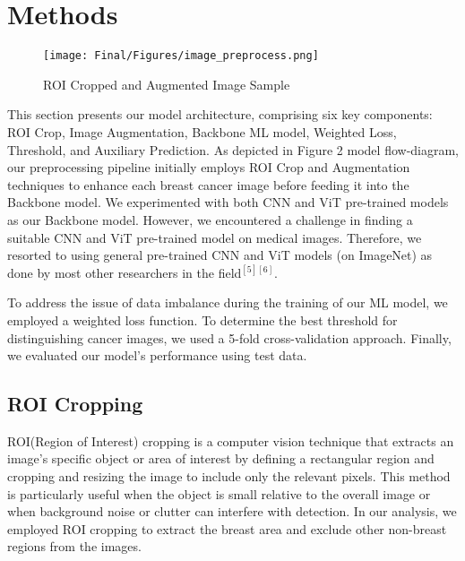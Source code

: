 \section{Methods}
\begin{figure*}[t]
    \centering
    \texttt{[image: Final/Figures/image\_preprocess.png]}
    \caption{ROI Cropped and Augmented Image Sample}
\end{figure*}

This section presents our model architecture, comprising six key components: ROI Crop, Image Augmentation, Backbone ML model, Weighted Loss, Threshold, and Auxiliary Prediction. As depicted in Figure 2 model flow-diagram, our preprocessing pipeline initially employs ROI Crop and Augmentation techniques to enhance each breast cancer image before feeding it into the Backbone model. We experimented with both CNN and ViT pre-trained models as our Backbone model. However, we encountered a challenge in finding a suitable CNN and ViT pre-trained model on medical images. Therefore, we resorted to using general pre-trained CNN and ViT models (on ImageNet) as done by most other researchers in the field${}^{[5][6]}$. 

To address the issue of data imbalance during the training of our ML model, we employed a weighted loss function. To determine the best threshold for distinguishing cancer images, we used a 5-fold cross-validation approach. Finally, we evaluated our model's performance using test data.

\subsection{ROI Cropping}
ROI(Region of Interest) cropping is a computer vision technique that extracts an image's specific object or area of interest by defining a rectangular region and cropping and resizing the image to include only the relevant pixels. This method is particularly useful when the object is small relative to the overall image or when background noise or clutter can interfere with detection. In our analysis, we employed ROI cropping to extract the breast area and exclude other non-breast regions from the images.


